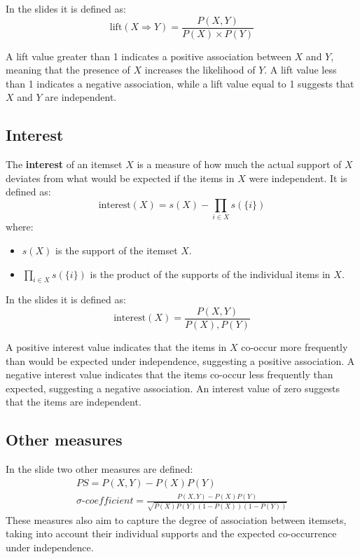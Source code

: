 In the slides it is defined as:
\[\text{lift}(X \Rightarrow Y) = \frac{P(X,Y)}{P(X) \times P(Y)}\]

A lift value greater than 1 indicates a positive association between $X$ and $Y$, meaning that the presence of $X$ increases the likelihood of $Y$. A lift value less than 1 indicates a negative association, while a lift value equal to 1 suggests that $X$ and $Y$ are independent.

\subsection{Interest}
The \textbf{interest} of an itemset $X$ is a measure of how much the actual support of $X$ deviates from what would be expected if the items in $X$ were independent. It is defined as:
\[\text{interest}(X) = s(X) - \prod_{i \in X} s(\{i\})\]
where:
\begin{itemize}
   \item $s(X)$ is the support of the itemset $X$.
   \item $\prod_{i \in X} s(\{i\})$ is the product of the supports of the individual items in $X$.
\end{itemize}

In the slides it is defined as:
\[\text{interest}(X) = \frac{P(X,Y)}{P(X),P(Y)}\]

A positive interest value indicates that the items in $X$ co-occur more frequently than would be expected under independence, suggesting a positive association. A negative interest value indicates that the items co-occur less frequently than expected, suggesting a negative association. An interest value of zero suggests that the items are independent.

\subsection{Other measures}
In the slide two other measures are defined:
\begin{align*}
   PS = P(X,Y) - P(X)P(Y) \\
   \sigma \textit{-coefficient} = \frac{P(X,Y) - P(X)P(Y)}{\sqrt{P(X)P(Y)(1-P(X))(1-P(Y))}}
\end{align*}
These measures also aim to capture the degree of association between itemsets, taking into account their individual supports and the expected co-occurrence under independence.

